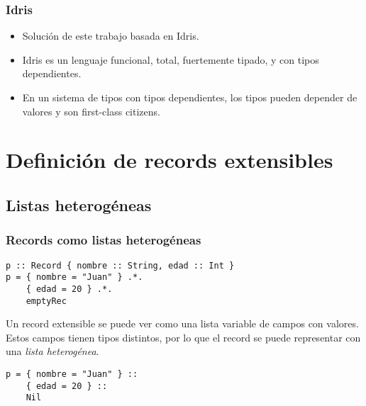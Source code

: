 \documentclass{beamer}
\begin{document}
\begin{frame}
\frametitle{Idris}

\begin{itemize}
\item Solución de este trabajo basada en Idris.
\item Idris es un lenguaje funcional, total, fuertemente tipado, y con tipos dependientes.
\item En un sistema de tipos con tipos dependientes, los tipos pueden depender de valores y son first-class citizens.
\end{itemize}
\end{frame}

\section{Definición de records extensibles}

\subsection{Listas heterogéneas}

\begin{frame}[fragile]
\frametitle{Records como listas heterogéneas}

\begin{example}
\begin{verbatim}
p :: Record { nombre :: String, edad :: Int }
p = { nombre = "Juan" } .*.
    { edad = 20 } .*.
    emptyRec
\end{verbatim}
\end{example}

\pause

Un record extensible se puede ver como una lista variable de campos con valores. Estos campos tienen tipos distintos, por lo que el record se puede representar con una \textit{lista heterogénea}. 

\pause

\begin{example}
\begin{verbatim}
p = { nombre = "Juan" } ::
    { edad = 20 } ::
    Nil
\end{verbatim}
\end{example}

\end{frame}
\end{document}
